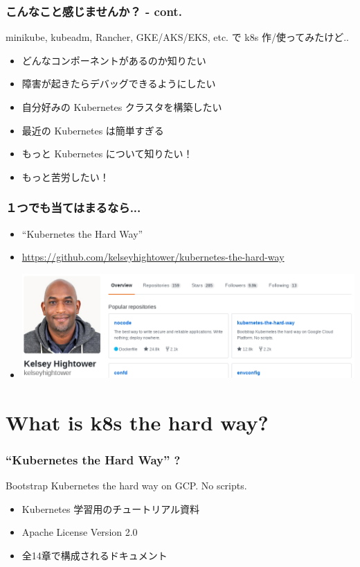 \documentclass[aspectratio=169,11pt,hyperref={colorlinks=true}]{beamer}
\begin{document}
\begin{frame}
  \frametitle{こんなこと感じませんか？ - cont.}
  minikube, kubeadm, Rancher, GKE/AKS/EKS, etc. で k8s 作/使ってみたけど..
  \begin{itemize}
    \item どんなコンポーネントがあるのか知りたい
    \item 障害が起きたらデバッグできるようにしたい
    \item 自分好みの Kubernetes クラスタを構築したい
    \item 最近の Kubernetes は簡単すぎる
    \item もっと Kubernetes について知りたい！
    \item もっと苦労したい！
  \end{itemize}
\end{frame}

\begin{frame}
  \frametitle{１つでも当てはまるなら...}
  \begin{itemize}
    \item[] \Huge{``Kubernetes the Hard Way''}\large{}
    \item \url{https://github.com/kelseyhightower/kubernetes-the-hard-way}
    \item[] \includegraphics[height=40mm]{images/kelseyhightower_overview.png}
  \end{itemize}
\end{frame}

\section{What is k8s the hard way?}
\begin{frame}
  \frametitle{``Kubernetes the Hard Way'' ?}
  Bootstrap Kubernetes the hard way on GCP. No scripts.
  \begin{itemize}
    \item Kubernetes 学習用のチュートリアル資料
    \item Apache License Version 2.0
    \item 全14章で構成されるドキュメント
  \end{itemize}
\end{frame}
\end{document}
